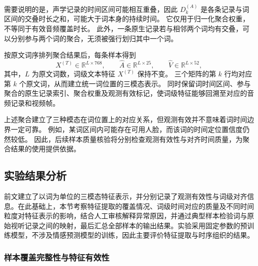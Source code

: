 需要说明的是，声学记录的时间区间可能相互重叠，因此
$D_k^{(A)}$ 是各条记录与词区间的交叠时长之和，可能大于词本身的持续时间。
它仅用于归一化聚合权重，不等同于有效音频覆盖时长。
此外，一条原生记录若与相邻两个词均有交叠，可以分别参与两个词的聚合，无须被强行划归其中一个词。

按原文词序排列聚合结果后，每条样本得到
\begin{equation}
X^{(T)}\in\mathbb{R}^{L\times768},
\qquad
\widehat{A}\in\mathbb{R}^{L\times25},
\qquad
\widehat{V}\in\mathbb{R}^{L\times52},
\label{eq:p1_aligned_feature_matrices}
\end{equation}
其中，$L$ 为原文词数，词级文本特征 $X^{(T)}$ 保持不变。
三个矩阵的第 $k$ 行均对应第 $k$ 个原文词，从而建立统一词位置的三模态表示。
同时保留词时间区间、参与聚合的原生记录索引、聚合权重及观测有效标记，使词级特征能够回溯至对应的音频记录和视频帧。

上述聚合建立了三种模态在词位置上的对应关系，但观测有效并不意味着词时间边界一定可靠。
例如，某词区间内可能存在可用人脸，而该词的时间定位置信度仍然较低。
因此，后续样本质量核验将分别检查观测有效性与对齐时间质量，为聚合结果的使用提供依据。
































\subsection{实验结果分析}
\label{sec:p1_results}
\newsavebox{\pOneResultTableBox}

前文建立了以词为单位的三模态特征表示，并分别记录了观测有效性与词级对齐信息。在此基础上，本节考察特征提取的覆盖情况、词级时间对应的质量及不同时间粒度对特征表示的影响，结合人工审核解释异常原因，并通过典型样本检验词与原始视听记录之间的映射，最后汇总全部样本的输出结果。实验采用固定参数的预训练模型，不涉及情感预测模型的训练，因此主要评价特征提取与时序组织的结果。

\subsubsection{样本覆盖完整性与特征有效性}
\label{sec:p1_quality_scope}

